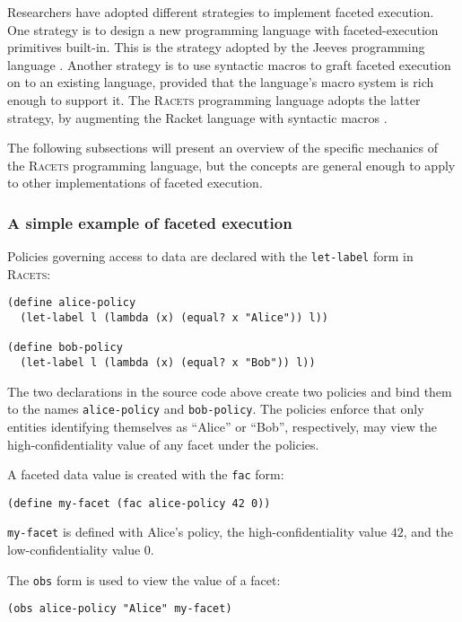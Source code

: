 \documentclass{article}
\begin{document}
Researchers have adopted different strategies to implement faceted execution. One strategy is to design a new programming language with faceted-execution primitives built-in. This is the strategy adopted by the Jeeves programming language \cite{jeeves}. Another strategy is to use syntactic macros to graft faceted execution on to an existing language, provided that the language's macro system is rich enough to support it. The \textsc{Racets} programming language adopts the latter strategy, by augmenting the Racket language with syntactic macros \cite{racets}.

The following subsections will present an overview of the specific mechanics of the \textsc{Racets} programming language, but the concepts are general enough to apply to other implementations of faceted execution.

\subsubsection{A simple example of faceted execution}
Policies governing access to data are declared with the \texttt{let-label} form in \textsc{Racets}:

\begin{lstlisting}
(define alice-policy
  (let-label l (lambda (x) (equal? x "Alice")) l))

(define bob-policy
  (let-label l (lambda (x) (equal? x "Bob")) l))
\end{lstlisting}

The two declarations in the source code above create two policies and bind them to the names \texttt{alice-policy} and \texttt{bob-policy}. The policies enforce that only entities identifying themselves as ``Alice'' or ``Bob'', respectively, may view the high-confidentiality value of any facet under the policies.

A faceted data value is created with the \texttt{fac} form:

\begin{lstlisting}
(define my-facet (fac alice-policy 42 0))
\end{lstlisting}

\texttt{my-facet} is defined with Alice's policy, the high-confidentiality value $42$, and the low-confidentiality value $0$.

The \texttt{obs} form is used to view the value of a facet:

\begin{lstlisting}
(obs alice-policy "Alice" my-facet)
\end{lstlisting}
\end{document}
